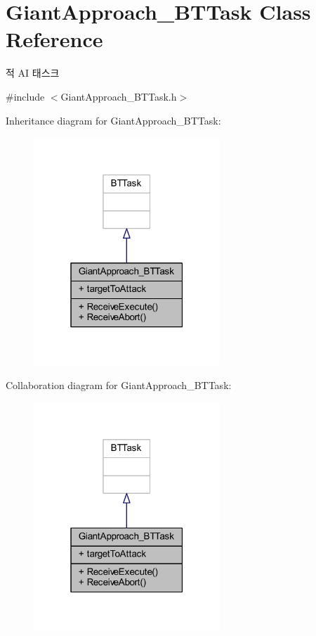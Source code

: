 \hypertarget{class_giant_approach___b_t_task}{}\section{Giant\+Approach\+\_\+\+B\+T\+Task Class Reference}
\label{class_giant_approach___b_t_task}


적 AI 태스크  




{\ttfamily \#include $<$Giant\+Approach\+\_\+\+B\+T\+Task.\+h$>$}



Inheritance diagram for Giant\+Approach\+\_\+\+B\+T\+Task\+:\nopagebreak
\begin{figure}[H]
\begin{center}
\leavevmode
\includegraphics[width=199pt]{class_giant_approach___b_t_task__inherit__graph}
\end{center}
\end{figure}


Collaboration diagram for Giant\+Approach\+\_\+\+B\+T\+Task\+:\nopagebreak
\begin{figure}[H]
\begin{center}
\leavevmode
\includegraphics[width=199pt]{class_giant_approach___b_t_task__coll__graph}
\end{center}
\end{figure}
